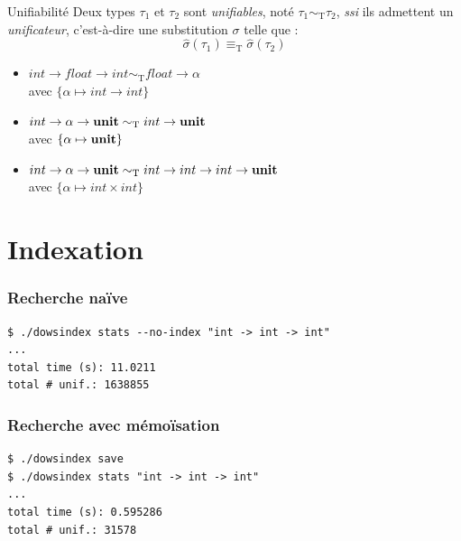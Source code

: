 \documentclass[serif]{beamer}
\newcommand{\ssi}{\textit{ssi}\xspace}
\newcommand{\unit}{\bold{unit}}
\newcommand{\T}{\mathrm{T}}
\begin{document}

\begin{frame}{Unifiabilité}
\small
Deux types $\tau_1$ et $\tau_2$ sont \emph{unifiables}, noté $\tau_1 \sim_\T \tau_2$, \ssi ils admettent un \emph{unificateur}, c'est-à-dire une substitution $\sigma$ telle que :
\[ \hat\sigma (\tau_1) \equiv_\T \hat\sigma (\tau_2) \]
\begin{itemize}
	\item $int \rightarrow float \rightarrow int \sim_\T float \rightarrow \alpha$ \\ avec $\{ \alpha \mapsto int \rightarrow int \}$
	\item $int \rightarrow \alpha \rightarrow \unit \sim_\T int \rightarrow \unit$ \\ avec $\{ \alpha \mapsto \unit \}$
	\item $int \rightarrow \alpha \rightarrow \unit \sim_\T int \rightarrow int \rightarrow int \rightarrow \unit$ \\ avec $\{ \alpha \mapsto int \times int \}$
\end{itemize}
\end{frame}


\section{Indexation}


\begin{frame}[fragile=singleslide]\frametitle{Recherche naïve}
\begin{verbatim}
$ ./dowsindex stats --no-index "int -> int -> int"
...
total time (s): 11.0211
total # unif.: 1638855
\end{verbatim}
\end{frame}


\begin{frame}[fragile=singleslide]\frametitle{Recherche avec mémoïsation}
\begin{verbatim}
$ ./dowsindex save
$ ./dowsindex stats "int -> int -> int"
...
total time (s): 0.595286
total # unif.: 31578
\end{verbatim}
\end{frame}
\end{document}
